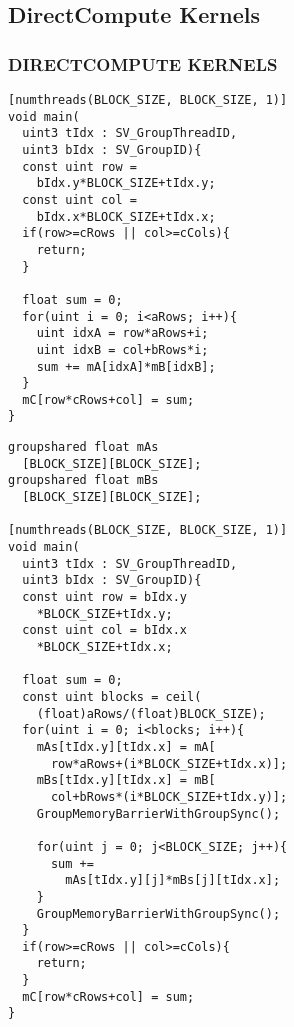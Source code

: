 \subsection{DirectCompute Kernels}
\begin{frame}[fragile]
\frametitle{DIRECTCOMPUTE KERNELS}

\begin{multicols}{2}
\begin{lstlisting}
[numthreads(BLOCK_SIZE, BLOCK_SIZE, 1)]
void main(
  uint3 tIdx : SV_GroupThreadID,
  uint3 bIdx : SV_GroupID){
  const uint row =
    bIdx.y*BLOCK_SIZE+tIdx.y;
  const uint col =
    bIdx.x*BLOCK_SIZE+tIdx.x;
  if(row>=cRows || col>=cCols){
    return;
  }

  float sum = 0;
  for(uint i = 0; i<aRows; i++){
    uint idxA = row*aRows+i;
    uint idxB = col+bRows*i;
    sum += mA[idxA]*mB[idxB];
  }
  mC[row*cRows+col] = sum;
}
\end{lstlisting}
\begin{lstlisting}
groupshared float mAs
  [BLOCK_SIZE][BLOCK_SIZE];
groupshared float mBs
  [BLOCK_SIZE][BLOCK_SIZE];

[numthreads(BLOCK_SIZE, BLOCK_SIZE, 1)]
void main(
  uint3 tIdx : SV_GroupThreadID,
  uint3 bIdx : SV_GroupID){
  const uint row = bIdx.y
    *BLOCK_SIZE+tIdx.y;
  const uint col = bIdx.x
    *BLOCK_SIZE+tIdx.x;
  
  float sum = 0;
  const uint blocks = ceil( 
    (float)aRows/(float)BLOCK_SIZE);
  for(uint i = 0; i<blocks; i++){
    mAs[tIdx.y][tIdx.x] = mA[ 
      row*aRows+(i*BLOCK_SIZE+tIdx.x)];
    mBs[tIdx.y][tIdx.x] = mB[ 
      col+bRows*(i*BLOCK_SIZE+tIdx.y)];
    GroupMemoryBarrierWithGroupSync();

    for(uint j = 0; j<BLOCK_SIZE; j++){
      sum += 
        mAs[tIdx.y][j]*mBs[j][tIdx.x];
    }
    GroupMemoryBarrierWithGroupSync();
  }
  if(row>=cRows || col>=cCols){
    return;
  }
  mC[row*cRows+col] = sum;
}
\end{lstlisting}
\end{multicols}

\end{frame}
